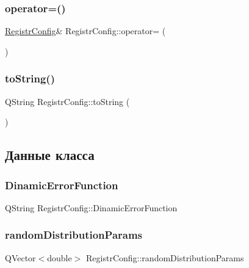 \subsubsection{\texorpdfstring{operator=()}{operator=()}}
{\footnotesize\ttfamily \hyperlink{class_registr_config}{Registr\+Config}\& Registr\+Config\+::operator= (\begin{DoxyParamCaption}\item[{const \hyperlink{class_registr_config}{Registr\+Config} \&}]{ }\end{DoxyParamCaption})}

\mbox{\label{class_registr_config_a76cb21bfd561fef06ac3db93d0499c90}} 
\subsubsection{\texorpdfstring{to\+String()}{toString()}}
{\footnotesize\ttfamily Q\+String Registr\+Config\+::to\+String (\begin{DoxyParamCaption}{ }\end{DoxyParamCaption})}



\subsection{Данные класса}
\mbox{\label{class_registr_config_a1729b4f02c0df66d4c9dbd4d96ebe3db}} 
\subsubsection{\texorpdfstring{Dinamic\+Error\+Function}{DinamicErrorFunction}}
{\footnotesize\ttfamily Q\+String Registr\+Config\+::\+Dinamic\+Error\+Function}

\mbox{\label{class_registr_config_a5957b23fb3bbb3c83f0bc0f757e943b4}} 
\subsubsection{\texorpdfstring{random\+Distribution\+Params}{randomDistributionParams}}
{\footnotesize\ttfamily Q\+Vector$<$double$>$ Registr\+Config\+::random\+Distribution\+Params}

